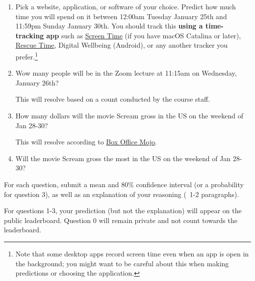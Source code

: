 \documentclass[11pt]{article}
\begin{document}
\begin{enumerate}
\item[0.] Pick a website, application, or software of your choice. Predict how much time you will spend on it between 12:00am Tuesday January 25th and 11:59pm Sunday January 30th. You should track this {\bf using a time-tracking app} such as \href{https://support.apple.com/en-us/HT210387}{Screen Time} (if you have macOS Catalina or later), \href{https://www.rescuetime.com/}{Rescue Time}, Digital Wellbeing (Android), or any another tracker you prefer.\footnote{Note that some desktop apps record screen time even when an app is open in the background; you might want to be careful about this when making predictions or choosing the application.}

\item[1.] Wow many people will be in the Zoom lecture at 11:15am on Wednesday, January 26th?

      This will resolve based on a count conducted by the course staff.

\item[2.] How many dollars will the movie Scream gross in the US on the weekend of Jan 28-30? 

      This will resolve according to \href{https://www.boxofficemojo.com/weekend/?ref_=bo_nb_wey_secondarytab}{Box Office Mojo}.

\item[3.] Will the movie Scream gross the most in the US on the weekend of Jan 28-30?

\end{enumerate}
 
For each question, submit a mean and 80\% confidence interval (or a probability for question 3), 
as well as an explanation of your reasoning (~1-2 paragraphs).

For questions 1-3, your prediction (but not the explanation) will appear on the public leaderboard. 
Question 0 will remain private and not count towards the leaderboard.
\end{document}
